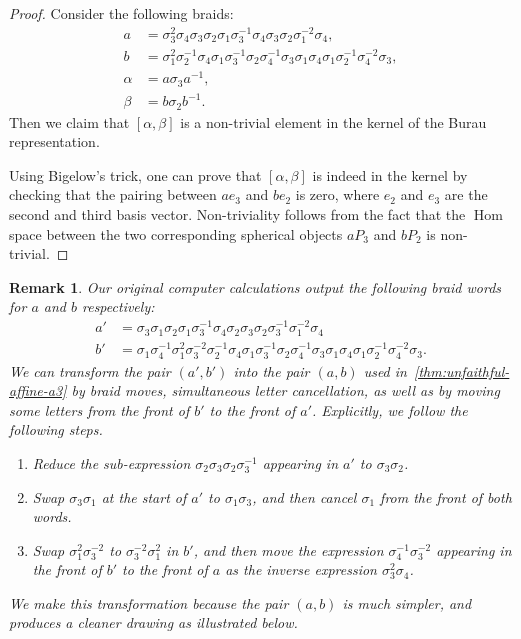 \documentclass[a4paper]{amsart}
\newcommand{\0}{\mathbf{0}}
\DeclareMathOperator{\Hom}{Hom}
\theoremstyle{theorem}
\newtheorem{remark}[theorem]{Remark}
\begin{document}
\begin{proof}
  Consider the following braids:
  \begin{align*}
    a & = \sigma_3^2\sigma_4\sigma_3\sigma_2\sigma_1\sigma_3^{-1}\sigma_4\sigma_3\sigma_2\sigma_1^{-2}\sigma_4,\\
    b & = \sigma_1^2\sigma_2^{-1}\sigma_4\sigma_1\sigma_3^{-1}\sigma_2\sigma_4^{-1}\sigma_3\sigma_1\sigma_4\sigma_1\sigma_2^{-1}\sigma_4^{-2}\sigma_3,\\
    \alpha &=a\sigma_3 a^{-1}, \\
    \beta &=b\sigma_2b^{-1}.
  \end{align*}
  Then we claim that $[\alpha,\beta]$ is a non-trivial element in the kernel of the Burau representation.

  Using Bigelow's trick, one can prove that \([\alpha,\beta]\) is indeed in the kernel by checking that the pairing between $ae_3$ and $be_2$ is zero, where $e_2$ and $e_3$ are the second and third basis vector.
  Non-triviality follows from the fact that the $\Hom$ space between the two corresponding spherical objects $aP_3$ and $bP_2$ is non-trivial.
\end{proof}

\begin{remark}
  Our original computer calculations output the following braid words for \(a\) and \(b\) respectively:
  \begin{align*}
    a' &=\sigma_3\sigma_1\sigma_2\sigma_1\sigma_{3}^{-1}\sigma_4\sigma_2\sigma_3\sigma_2\sigma_{3}^{-1}\sigma_1^{-2}\sigma_{4} \\
    b' &=\sigma_1\sigma_{4}^{-1}\sigma_1^2\sigma_3^{-2}\sigma_{2}^{-1}\sigma_4\sigma_1\sigma_{3}^{-1}\sigma_2\sigma_4^{-1}\sigma_3\sigma_{1}\sigma_{4}\sigma_{1}\sigma_2^{-1}\sigma_4^{-2}\sigma_3.
  \end{align*}
  We can transform the pair \((a',b')\) into the pair \((a,b)\) used in~\cref{thm:unfaithful-affine-a3} by braid moves, simultaneous letter cancellation, as well as by moving some letters from the front of \(b'\) to the front of \(a'\).
  Explicitly, we follow the following steps.
  \begin{enumerate}
  \item Reduce the sub-expression \(\sigma_2\sigma_3\sigma_2\sigma_3^{-1}\) appearing in \(a'\) to \(\sigma_3\sigma_2\).
  \item Swap \(\sigma_3\sigma_1\) at the start of \(a'\) to \(\sigma_1\sigma_3\), and then cancel \(\sigma_1\) from the front of both words.
  \item Swap \(\sigma_1^2\sigma_3^{-2}\) to \(\sigma_3^{-2}\sigma_1^2\) in \(b'\), and then move the expression \(\sigma_4^{-1}\sigma_3^{-2}\) appearing in the front of \(b'\) to the front of \(a\) as the inverse expression \(\sigma_3^2\sigma_4\).
  \end{enumerate}
  We make this transformation because the pair \((a,b)\) is much simpler, and produces a cleaner drawing as illustrated below.
\end{remark}
\end{document}
